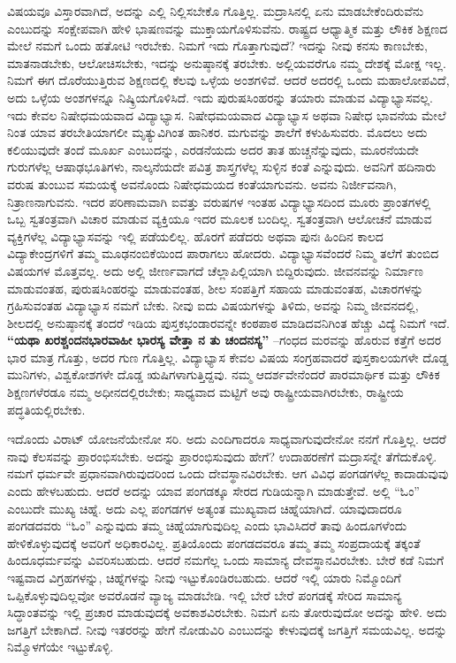 ವಿಷಯವೂ ವಿಸ್ತಾರವಾಗಿದೆ, ಅದನ್ನು ಎಲ್ಲಿ ನಿಲ್ಲಿಸಬೇಕೊ ಗೊತ್ತಿಲ್ಲ. ಮದ್ರಾಸಿನಲ್ಲಿ ಏನು ಮಾಡಬೇಕೆಂದಿರುವೆನು ಎಂಬುದನ್ನು ಸಂಕ್ಷೇಪವಾಗಿ ಹೇಳಿ ಭಾಷಣವನ್ನು ಮುಕ್ತಾಯಗೊಳಿಸುವೆನು. ರಾಷ್ಟ್ರದ ಆಧ್ಯಾತ್ಮಿಕ ಮತ್ತು ಲೌಕಿಕ ಶಿಕ್ಷಣದ ಮೇಲೆ ನಮಗೆ ಒಂದು ಹತೋಟಿ ಇರಬೇಕು. ನಿಮಗೆ ಇದು ಗೊತ್ತಾಗುವುದೆ? ಇದನ್ನು ನೀವು ಕನಸು ಕಾಣಬೇಕು, ಮಾತನಾಡಬೇಕು, ಆಲೋಚಿಸಬೇಕು, ಇದನ್ನು ಅನುಷ್ಠಾನಕ್ಕೆ ತರಬೇಕು. ಅಲ್ಲಿಯವರೆಗೂ ನಮ್ಮ ದೇಶಕ್ಕೆ ಮೋಕ್ಷ ಇಲ್ಲ. ನಿಮಗೆ ಈಗ ದೊರೆಯುತ್ತಿರುವ ಶಿಕ್ಷಣದಲ್ಲಿ ಕೆಲವು ಒಳ್ಳೆಯ ಅಂಶಗಳಿವೆ. ಆದರೆ ಅದರಲ್ಲಿ ಒಂದು ಮಹಾಲೋಪವಿದೆ, ಅದು ಒಳ್ಳೆಯ ಅಂಶಗಳನ್ನೂ ನಿಷ್ಕ್ರಿಯಗೊಳಿಸಿದೆ. ಇದು ಪುರುಷಸಿಂಹರನ್ನು ತಯಾರು ಮಾಡುವ ವಿದ್ಯಾಭ್ಯಾಸವಲ್ಲ. ಇದು ಕೇವಲ ನಿಷೇಧಮಯವಾದ ವಿದ್ಯಾಭ್ಯಾಸ. ನಿಷೇಧಮಯವಾದ ವಿದ್ಯಾಭ್ಯಾಸ ಅಥವಾ ನಿಷೇಧ ಭಾವನೆಯ ಮೇಲೆ ನಿಂತ ಯಾವ ತರಬೇತಿಯಾಗಲೀ ಮೃತ್ಯುವಿಗಿಂತ ಹಾನಿಕರ. ಮಗುವನ್ನು ಶಾಲೆಗೆ ಕಳುಹಿಸುವರು. ಮೊದಲು ಅದು ಕಲಿಯುವುದೇ ತಂದೆ ಮೂರ್ಖ ಎಂಬುದನ್ನು, ಎರಡನೆಯದು ಅದರ ತಾತ ಹುಚ್ಚನೆನ್ನುವುದು, ಮೂರನೆಯದೇ ಗುರುಗಳೆಲ್ಲ ಆಷಾಢಭೂತಿಗಳು, ನಾಲ್ಕನೆಯದೇ ಪವಿತ್ರ ಶಾಸ್ತ್ರಗಳೆಲ್ಲ ಸುಳ್ಳಿನ ಕಂತೆ ಎನ್ನುವುದು. ಅವನಿಗೆ ಹದಿನಾರು ವರುಷ ತುಂಬುವ ಸಮಯಕ್ಕೆ ಅವನೊಂದು ನಿಷೇಧಮಯದ ಕಂತೆಯಾಗುವನು. ಅವನು ನಿರ್ಜೀವನಾಗಿ, ನಿತ್ರಾಣನಾಗುವನು. ಇದರ ಪರಿಣಾಮವಾಗಿ ಐವತ್ತು ವರುಷಗಳ ಇಂತಹ ವಿದ್ಯಾಭ್ಯಾಸದಿಂದ ಮೂರು ಪ್ರಾಂತಗಳಲ್ಲಿ ಒಬ್ಬ ಸ್ವತಂತ್ರವಾಗಿ ವಿಚಾರ ಮಾಡುವ ವ್ಯಕ್ತಿಯೂ ಇದರ ಮೂಲಕ ಬಂದಿಲ್ಲ. ಸ್ವತಂತ್ರವಾಗಿ ಆಲೋಚನೆ ಮಾಡುವ ವ್ಯಕ್ತಿಗಳೆಲ್ಲ ವಿದ್ಯಾಭ್ಯಾಸವನ್ನು ಇಲ್ಲಿ ಪಡೆಯಲಿಲ್ಲ. ಹೊರಗೆ ಪಡೆದರು ಅಥವಾ ಪುನಃ ಹಿಂದಿನ ಕಾಲದ ವಿದ್ಯಾಕೇಂದ್ರಗಳಿಗೆ ತಮ್ಮ ಮೂಢನಂಬಿಕೆಯಿಂದ ಪಾರಾಗಲು ಹೋದರು. ವಿದ್ಯಾಭ್ಯಾಸವೆಂದರೆ ನಿಮ್ಮ ತಲೆಗೆ ತುಂಬಿದ ವಿಷಯಗಳ ಮೊತ್ತವಲ್ಲ. ಅದು ಅಲ್ಲಿ ಜೀರ್ಣವಾಗದೆ ಚೆಲ್ಲಾಪಿಲ್ಲಿಯಾಗಿ ಬಿದ್ದಿರುವುದು. ಜೀವನವನ್ನು ನಿರ್ಮಾಣ ಮಾಡುವಂತಹ, ಪುರುಷಸಿಂಹರನ್ನು ಮಾಡುವಂತಹ, ಶೀಲ ಸಂಪತ್ತಿಗೆ ಸಹಾಯ ಮಾಡುವಂತಹ, ವಿಚಾರಗಳನ್ನು ಗ್ರಹಿಸುವಂತಹ ವಿದ್ಯಾಭ್ಯಾಸ ನಮಗೆ ಬೇಕು. ನೀವು ಐದು ವಿಷಯಗಳನ್ನು ತಿಳಿದು, ಅವನ್ನು ನಿಮ್ಮ ಜೀವನದಲ್ಲಿ, ಶೀಲದಲ್ಲಿ ಅನುಷ್ಠಾನಕ್ಕೆ ತಂದರೆ ಇಡಿಯ ಪುಸ್ತಕಭಂಡಾರವನ್ನೇ ಕಂಠಪಾಠ ಮಾಡಿದವನಿಗಿಂತ ಹೆಚ್ಚು ವಿದ್ಯೆ ನಿಮಗೆ ಇದೆ. \textbf{“ಯಥಾ ಖರಶ್ಚಂದನಭಾರವಾಹೀ ಭಾರಸ್ಯ ವೇತ್ತಾ ನ ತು ಚಂದನಸ್ಯ”} –ಗಂಧದ ಮರವನ್ನು ಹೊರುವ ಕತ್ತೆಗೆ ಅದರ ಭಾರ ಮಾತ್ರ ಗೊತ್ತು, ಅದರ ಗುಣ ಗೊತ್ತಿಲ್ಲ. ವಿದ್ಯಾಭ್ಯಾಸ ಕೇವಲ ವಿಷಯ ಸಂಗ್ರಹವಾದರೆ ಪುಸ್ತಕಾಲಯಗಳೇ ದೊಡ್ಡ ಮುನಿಗಳು, ವಿಶ್ವಕೋಶಗಳೇ ದೊಡ್ಡ ಋಷಿಗಳಾಗುತ್ತಿದ್ದವು. ನಮ್ಮ ಆದರ್ಶವೇನೆಂದರೆ ಪಾರಮಾರ್ಥಿಕ ಮತ್ತು ಲೌಕಿಕ ಶಿಕ್ಷಣಗಳೆರಡೂ ನಮ್ಮ ಅಧೀನದಲ್ಲಿರಬೇಕು; ಸಾಧ್ಯವಾದ ಮಟ್ಟಿಗೆ ಅವು ರಾಷ್ಟ್ರೀಯವಾಗಿರಬೇಕು, ರಾಷ್ಟ್ರೀಯ ಪದ್ಧತಿಯಲ್ಲಿರಬೇಕು.

\vskip 3pt

ಇದೊಂದು ವಿರಾಟ್​ ಯೋಜನೆಯೇನೋ ಸರಿ. ಅದು ಎಂದಿಗಾದರೂ ಸಾಧ್ಯವಾಗುವುದೇನೋ ನನಗೆ ಗೊತ್ತಿಲ್ಲ. ಆದರೆ ನಾವು ಕೆಲಸವನ್ನು ಪ್ರಾರಂಭಿಸಬೇಕು. ಅದನ್ನು ಪ್ರಾರಂಭಿಸುವುದು ಹೇಗೆ? ಉದಾಹರಣೆಗೆ ಮದ್ರಾಸನ್ನೇ ತೆಗೆದುಕೊಳ್ಳಿ. ನಮಗೆ ಧರ್ಮವೇ ಪ್ರಧಾನವಾಗಿರುವುದರಿಂದ ಒಂದು ದೇವಸ್ಥಾನವಿರಬೇಕು. ಆಗ ವಿವಿಧ ಪಂಗಡಗಳೆಲ್ಲ ಕಾದಾಡುವುವು ಎಂದು ಹೇಳಬಹುದು. ಆದರೆ ಅದನ್ನು ಯಾವ ಪಂಗಡಕ್ಕೂ ಸೇರದ ಗುಡಿಯನ್ನಾಗಿ ಮಾಡುತ್ತೇವೆ. ಅಲ್ಲಿ “ಓಂ” ಎಂಬುದೇ ಮುಖ್ಯ ಚಿಹ್ನೆ. ಅದು ಎಲ್ಲ ಪಂಗಡಗಳ ಅತ್ಯಂತ ಮುಖ್ಯವಾದ ಚಿಹ್ನೆಯಾಗಿದೆ. ಯಾವುದಾದರೂ ಪಂಗಡದವರು “ಓಂ” ಎನ್ನುವುದು ತಮ್ಮ ಚಿಹ್ನೆಯಾಗುವುದಿಲ್ಲ ಎಂದು ಭಾವಿಸಿದರೆ ತಾವು ಹಿಂದೂಗಳೆಂದು ಹೇಳಿಕೊಳ್ಳುವುದಕ್ಕೆ ಅವರಿಗೆ ಅಧಿಕಾರವಿಲ್ಲ. ಪ್ರತಿಯೊಂದು ಪಂಗಡದವರೂ ತಮ್ಮ ತಮ್ಮ ಸಂಪ್ರದಾಯಕ್ಕೆ ತಕ್ಕಂತೆ ಹಿಂದೂಧರ್ಮವನ್ನು ವಿವರಿಸಬಹುದು. ಆದರೆ ನಮಗೆಲ್ಲ ಒಂದು ಸಾಮಾನ್ಯ ದೇವಸ್ಥಾನವಿರಬೇಕು. ಬೇರೆ ಕಡೆ ನಿಮಗೆ ಇಷ್ಟವಾದ ವಿಗ್ರಹಗಳನ್ನು, ಚಿಹ್ನೆಗಳನ್ನು ನೀವು ಇಟ್ಟುಕೊಂಡಿರಬಹುದು. ಆದರೆ ಇಲ್ಲಿ ಯಾರು ನಿಮ್ಮೊಂದಿಗೆ ಒಪ್ಪಿಕೊಳ್ಳುವುದಿಲ್ಲವೋ ಅವರೊಡನೆ ವ್ಯಾಜ್ಯ ಮಾಡಬೇಡಿ. ಇಲ್ಲಿ ಬೇರೆ ಬೇರೆ ಪಂಗಡಕ್ಕೆ ಸೇರಿದ ಸಾಮಾನ್ಯ ಸಿದ್ಧಾಂತವನ್ನು ಇಲ್ಲಿ ಪ್ರಚಾರ ಮಾಡುವುದಕ್ಕೆ ಅವಕಾಶವಿರಬೇಕು. ನಿಮಗೆ ಏನು ತೋರುವುದೋ ಅದನ್ನು ಹೇಳಿ. ಅದು ಜಗತ್ತಿಗೆ ಬೇಕಾಗಿದೆ. ನೀವು ಇತರರನ್ನು ಹೇಗೆ ನೋಡುವಿರಿ ಎಂಬುದನ್ನು ಕೇಳುವುದಕ್ಕೆ ಜಗತ್ತಿಗೆ ಸಮಯವಿಲ್ಲ. ಅದನ್ನು ನಿಮ್ಮೊಳಗೆಯೇ ಇಟ್ಟುಕೊಳ್ಳಿ.

